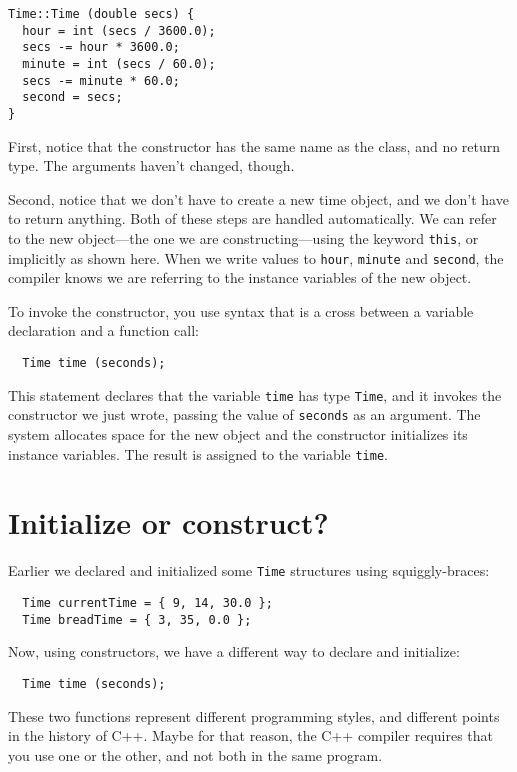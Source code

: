 \begin{verbatim}
Time::Time (double secs) {
  hour = int (secs / 3600.0);
  secs -= hour * 3600.0;
  minute = int (secs / 60.0);
  secs -= minute * 60.0;
  second = secs;
}
\end{verbatim}
%
First, notice that the constructor has the same name as the
class, and no return type.  The arguments haven't changed, though.

Second, notice that we don't have to create a new time object,
and we don't have to return anything.  Both of these steps are
handled automatically.  We can refer to the new object---the one
we are constructing---using the keyword {\tt this}, or implicitly
as shown here.  When we write values to {\tt hour}, {\tt minute}
and {\tt second}, the compiler knows we are referring to the instance
variables of the new object.

To invoke the constructor, you use syntax that is a cross
between a variable declaration and a function call:

\begin{verbatim}
  Time time (seconds);
\end{verbatim}
%
This statement declares that the variable {\tt time} has
type {\tt Time}, and it invokes the constructor we just wrote,
passing the value of {\tt seconds} as an argument.  The system
allocates space for the new object and the constructor initializes
its instance variables.  The result is assigned to the variable
{\tt time}.


\section {Initialize or construct?}

Earlier we declared and initialized some {\tt Time} structures
using squiggly-braces:

\begin{verbatim}
  Time currentTime = { 9, 14, 30.0 };
  Time breadTime = { 3, 35, 0.0 };
\end{verbatim}
%
Now, using constructors, we have a different way to declare
and initialize:

\begin{verbatim}
  Time time (seconds);
\end{verbatim}
%
These two functions represent different programming styles, and
different points in the history of C++.  Maybe
for that reason, the C++ compiler requires that you use one or
the other, and not both in the same program.


